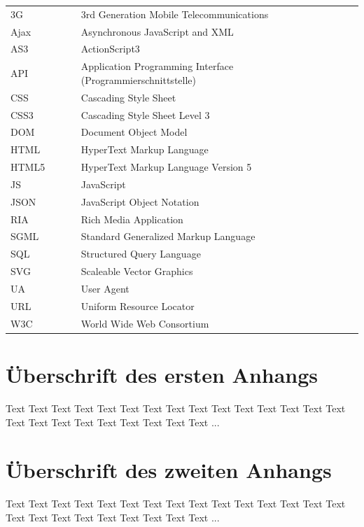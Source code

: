 \documentclass[a4paper,bibtotoc,oneside]{scrbook}
\begin{document}
\hspace{-17mm}\begin{tabular}{>{\raggedleft}p{0.2\linewidth} p{0.75\linewidth}
p{0.1\linewidth}}
3G & 3rd Generation Mobile Telecommunications \\
Ajax & Asynchronous JavaScript and XML \\
AS3 & ActionScript3 \\
API & Application Programming Interface (Programmierschnittstelle) \\
CSS & Cascading Style Sheet \\
CSS3 & Cascading Style Sheet Level 3 \\
DOM & Document Object Model \\
HTML & HyperText Markup Language \\
HTML5 & HyperText Markup Language Version 5 \\
JS & JavaScript \\
JSON & JavaScript Object Notation \\
RIA & Rich Media Application \\
SGML & Standard Generalized Markup Language \\
SQL & Structured Query Language \\
SVG & Scaleable Vector Graphics \\
UA & User Agent \\
URL & Uniform Resource Locator \\
W3C & World Wide Web Consortium \\

\end{tabular}


\begin{appendix}
\chapter[Erster Anhang]{Überschrift des ersten Anhangs}

Text Text Text Text Text Text Text Text Text Text Text Text Text Text Text Text
Text Text Text Text Text Text Text Text ...


\chapter[Zweiter Anhang]{Überschrift des zweiten Anhangs}

Text Text Text Text Text Text Text Text Text Text Text Text Text Text Text Text
Text Text Text Text Text Text Text Text ...

\end{appendix}
\end{document}
